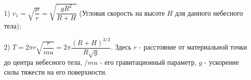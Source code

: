 1) $v_1 = \sqrt{\dfrac{\mu}{r}} = \sqrt{\dfrac{gR^2}{R + H}}$ (Угловая скорость на высоте $H$ для данного небесного тела);

2) $T = 2\pi r\sqrt{\dfrac{r}{mu}} = 2\pi\dfrac{(R+H)^{ 3/2 }}{R\sqrt{g}}$. Здесь $r$ - расстояние от материальной точки до центра небесного тела, $/mu$ - его гравитационный параметр, $g$ - ускорение силы тяжести на его поверхности.
